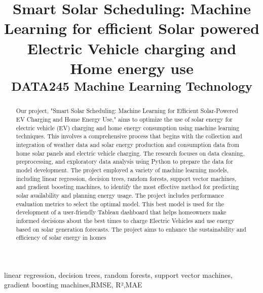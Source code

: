 \documentclass[conference]{IEEEtran}
\begin{document}
\title{Smart Solar Scheduling: Machine Learning for efficient Solar powered Electric Vehicle charging and Home energy use
\\
{\footnotesize \textsuperscript{DATA245 Machine Learning Technology}}
}

\author{
}
\maketitle

\begin{abstract}
Our project, "Smart Solar Scheduling: Machine Learning for Efficient Solar-Powered EV Charging and Home Energy Use," aims to optimize the use of solar energy for electric vehicle (EV) charging and home energy consumption using machine learning techniques. This involves a comprehensive process that begins with the collection and integration of weather data and solar energy production and consumption data from home solar panels and electric vehicle charging. The research focuses on data cleaning, preprocessing, and exploratory data analysis using Python to prepare the data for model development. The project employed a variety of machine learning models, including linear regression, decision trees, random forests, support vector machines, and gradient boosting machines, to identify the most effective method for predicting solar availability and planning energy usage. The project includes performance evaluation metrics to select the optimal model. This best model is used for the development of a user-friendly Tableau dashboard that helps homeowners make informed decisions about the best times to charge Electric Vehicles and use energy based on solar generation forecasts. The project aims to enhance the sustainability and efficiency of solar energy in homes
\end{abstract}

\begin{IEEEkeywords}
linear regression, decision trees, random forests, support vector machines, gradient boosting machines,RMSE, R²,MAE
\end{IEEEkeywords}
\end{document}
